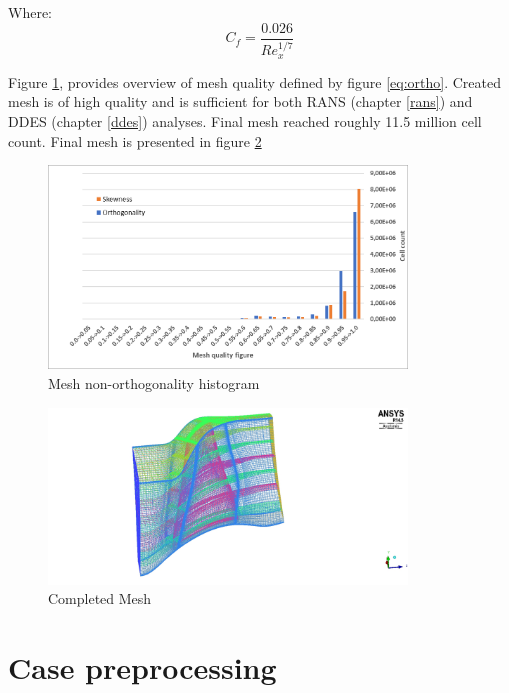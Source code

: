 Where:
\begin{equation}
C_f = \frac{0.026}{Re_{x}^{1/7}}
\end{equation}

Figure \ref{mesh-ortho}, provides overview of mesh quality defined by figure \ref{eq:ortho}. Created mesh is of high quality and is sufficient for both RANS (chapter \ref{rans}) and DDES (chapter \ref{ddes}) analyses. Final mesh reached roughly 11.5 million cell count. Final mesh is presented in figure \ref{meshfinal} 

\begin{figure}[h!]
\centering %
\includegraphics[width=0.85\textwidth]{Pictures/mesh_ortho.png}
\caption{Mesh non-orthogonality histogram}
\label{mesh-ortho}
\end{figure}

\begin{figure}[h!]
\centering %
\includegraphics[width=0.85\textwidth]{Pictures/r67_ransmesh.jpg}
\caption{Completed Mesh}
\label{meshfinal}
\end{figure}

\section{Case preprocessing} \label{casepre}


